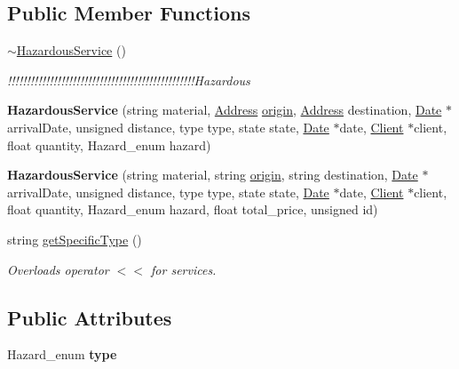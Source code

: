 \subsection*{Public Member Functions}
\begin{DoxyCompactItemize}
\item 
\mbox{\label{class_hazardous_service_a3fe8e09c08eae13090f8be3a2c4750da}} 
\hyperlink{class_hazardous_service_a3fe8e09c08eae13090f8be3a2c4750da}{$\sim$\+Hazardous\+Service} ()
\begin{DoxyCompactList}\small\item\em !!!!!!!!!!!!!!!!!!!!!!!!!!!!!!!!!!!!!!!!!!!!!!!!!\+Hazardous \end{DoxyCompactList}\item 
\mbox{\label{class_hazardous_service_afcd54cb1f6917720b1845c80e8503827}} 
{\bfseries Hazardous\+Service} (string material, \hyperlink{class_address}{Address} \hyperlink{class_service_a4abd0a104d97e5bdb8e8ca93bab31ce7}{origin}, \hyperlink{class_address}{Address} destination, \hyperlink{class_date}{Date} $\ast$arrival\+Date, unsigned distance, type type, state state, \hyperlink{class_date}{Date} $\ast$date, \hyperlink{class_client}{Client} $\ast$client, float quantity, Hazard\+\_\+enum hazard)
\item 
\mbox{\label{class_hazardous_service_af33995d8d0934550a13aa8439c825f9b}} 
{\bfseries Hazardous\+Service} (string material, string \hyperlink{class_service_a4abd0a104d97e5bdb8e8ca93bab31ce7}{origin}, string destination, \hyperlink{class_date}{Date} $\ast$arrival\+Date, unsigned distance, type type, state state, \hyperlink{class_date}{Date} $\ast$date, \hyperlink{class_client}{Client} $\ast$client, float quantity, Hazard\+\_\+enum hazard, float total\+\_\+price, unsigned id)
\item 
string \hyperlink{class_hazardous_service_a683cc101557a61d0ac6c36cbe67bf6c2}{get\+Specific\+Type} ()
\begin{DoxyCompactList}\small\item\em Overloads operator $<$$<$ for services. \end{DoxyCompactList}\end{DoxyCompactItemize}
\subsection*{Public Attributes}
\begin{DoxyCompactItemize}
\item 
\mbox{\label{class_hazardous_service_a210252b82d2999d1743d2d695798a555}} 
Hazard\+\_\+enum {\bfseries type}
\end{DoxyCompactItemize}
